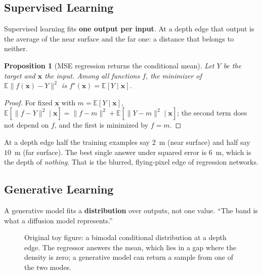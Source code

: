 \documentclass[11pt,a4paper]{article}
\newcommand{\E}{\mathbb{E}}
\newcommand{\bx}{\bm{x}}
\theoremstyle{definition}
\theoremstyle{plain}
\newtheorem{proposition}[definition]{Proposition}
\theoremstyle{remark}
\begin{document}
\subsection{Supervised Learning }
Supervised learning fits \textbf{one output per input}. At a depth edge that output is the average of the near surface and the far one: a distance that belongs to neither.

\begin{proposition}[MSE regression returns the conditional mean]
Let $Y$ be the target and $\bx$ the input. Among all functions $f$, the minimizer of $\E\|f(\bx)-Y\|^2$ is $f^\star(\bx)=\E[Y\mid\bx]$.
\end{proposition}
\begin{proof}
For fixed $\bx$ with $m=\E[Y\mid \bx]$, $\E[\|f-Y\|^2\mid\bx]=\|f-m\|^2+\E[\|Y-m\|^2\mid\bx]$; the second term does not depend on $f$, and the first is minimized by $f=m$.
\end{proof}

\begin{intuition}
At a depth edge half the training examples say $2$~m (near surface) and half say $10$~m (far surface). The best single answer under squared error is $6$~m, which is the depth of \emph{nothing}. That is the blurred, flying-pixel edge of regression networks.
\end{intuition}

\subsection{Generative Learning }
A generative model fits a \textbf{distribution} over outputs, not one value. ``The band is what a diffusion model represents.''

\begin{figure}[H]
\centering
{}
\caption{Original toy figure: a bimodal conditional distribution at a depth edge. The regressor answers the mean, which lies in a gap where the density is zero; a generative model can return a sample from one of the two modes.}
\end{figure}
\end{document}
